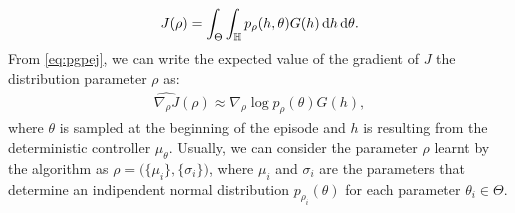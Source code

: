 \begin{align}
J(\rho) = \int_{\Theta} \int_{\mathbb{H}} p_{\rho}(h, \theta) G(h) \,\mathrm{d} h \,\mathrm{d} \theta. \label{eq:pgpej}
\end{align}
From \ref{eq:pgpej}, we can write the expected value of the gradient of $J$ \wrt the distribution parameter $\rho$ as:
\begin{align}
	\widehat{\nabla_{\rho}J}(\rho) \approx \nabla_{\rho} \log p_{\rho} (\theta) G(h),
\end{align}
where $\theta$ is sampled at the beginning of the episode and $h$ is resulting from the deterministic controller $\mu_{\theta}$. Usually, we can consider the parameter $\rho$ learnt by the algorithm as $\rho = \Big( \{\mu_i\}, \{\sigma_i\} \Big)$, where $\mu_i$ and $\sigma_i$ are the parameters that determine an indipendent normal distribution $p_{\rho_i}(\theta)$ for each parameter $\theta_i \in \Theta$.  

